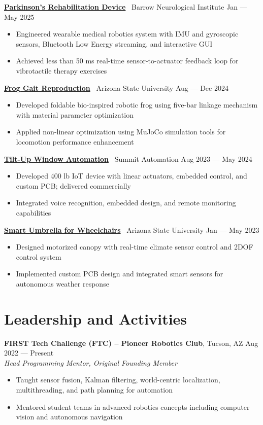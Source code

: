 \documentclass[10pt]{article}
\begin{document}
\textbf{\href{https://github.com/MGross21/syncstride-wearable}{Parkinson's Rehabilitation Device}} \textbar\ Barrow Neurological Institute \hfill Jan --- May 2025
\begin{itemize}
  \item Engineered wearable medical robotics system with IMU and gyroscopic sensors, Bluetooth Low Energy streaming, and interactive GUI
  \item Achieved less than 50 ms real-time sensor-to-actuator feedback loop for vibrotactile therapy exercises
\end{itemize}

\textbf{\href{https://github.com/MGross21/Robotic-Jumping-Frog}{Frog Gait Reproduction}} \textbar\ Arizona State University \hfill Aug --- Dec 2024
\begin{itemize}
  \item Developed foldable bio-inspired robotic frog using five-bar linkage mechanism with material parameter optimization
  \item Applied non-linear optimization using MuJoCo simulation tools for locomotion performance enhancement
\end{itemize}

\textbf{\href{https://www.youtube.com/watch?v=i5I38tLkD6o}{Tilt-Up Window Automation}} \textbar\ Summit Automation \hfill Aug 2023 --- May 2024
\begin{itemize}
  \item Developed 400 lb IoT device with linear actuators, embedded control, and custom PCB; delivered commercially
  \item Integrated voice recognition, embedded design, and remote monitoring capabilities
\end{itemize}

\textbf{\href{https://EGR314-Team205.github.io}{Smart Umbrella for Wheelchairs}} \textbar\ Arizona State University \hfill Jan --- May 2023
\begin{itemize}
  \item Designed motorized canopy with real-time climate sensor control and 2DOF control system
  \item Implemented custom PCB design and integrated smart sensors for autonomous weather response
\end{itemize}

\section*{Leadership and Activities}
\textbf{FIRST Tech Challenge (FTC) -- Pioneer Robotics Club}, Tucson, AZ \hfill Aug 2022 --- Present \\
\textit{Head Programming Mentor, Original Founding Member}
\begin{itemize}
  \item Taught sensor fusion, Kalman filtering, world-centric localization, multithreading, and path planning for automation
  \item Mentored student teams in advanced robotics concepts including computer vision and autonomous navigation
\end{itemize}
\end{document}
